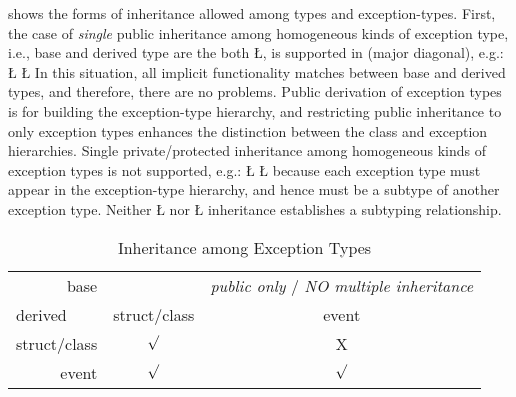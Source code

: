 \documentclass[openright,twoside]{report}
\begin{document}
 shows the forms of inheritance allowed among \CC types and \uC exception-types.
First, the case of \emph{single} public inheritance among homogeneous kinds of exception type, i.e., base and derived type are the both \LGinlinetrue\LGbegin\lgrinde\L{}\endlgrinde\LGend{}, is supported in \uC (major diagonal), e.g.:
\LGinlinefalse\LGbegin\lgrinde
\L{}
\L{}
\CE{}\endlgrinde\LGend
In this situation, all implicit functionality matches between base and derived types, and therefore, there are no problems.
Public derivation of exception types is for building the exception-type hierarchy, and restricting public inheritance to only exception types enhances the distinction between the class and exception hierarchies.
Single private/protected inheritance among homogeneous kinds of exception types is not supported, e.g.:
\LGinlinefalse\LGbegin\lgrinde
\L{}
\CE{}\L{}
\CE{}\endlgrinde\LGend
because each exception type must appear in the exception-type hierarchy, and hence must be a subtype of another exception type.
Neither \LGinlinetrue\LGbegin\lgrinde\L{}\endlgrinde\LGend{} nor \LGinlinetrue\LGbegin\lgrinde\L{}\endlgrinde\LGend{} inheritance establishes a subtyping relationship.

\begin{table}[ht]
\begin{center}
\begin{tabular}{r||c|c}
\multicolumn{1}{r||}{base}	& \multicolumn{1}{c}{}	& \multicolumn{1}{|c}{\emph{public only} / \emph{NO multiple inheritance}}		\\
\cline{2-3}
\multicolumn{1}{l||}{derived}& struct/class		& event			\\
\hline
\hline
struct/class				& $\surd$	& \textsf{X}\\
\hline
event						& $\surd$	& $\surd$	\\
\end{tabular}
\par
\end{center}
\caption{Inheritance among Exception Types}
\label{f:InheritanceAmongExceptionTypes}
\end{table}
\end{document}
